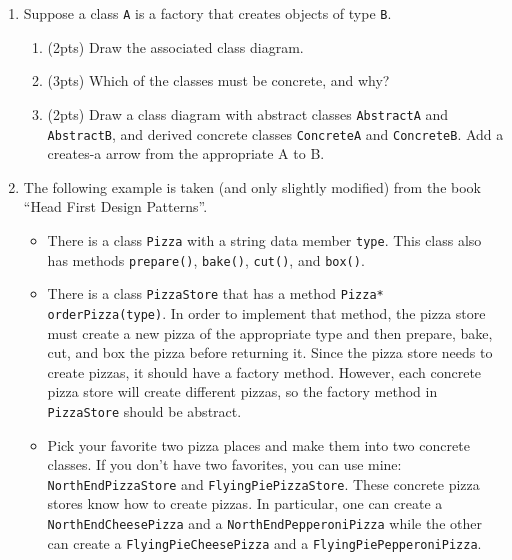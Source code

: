 \documentclass[11pt]{article}
\newlength{\up}\setlength{\up}{-\baselineskip}
\begin{document}
\begin{enumerate}
  \item Suppose a class \texttt{A} is a factory that creates objects of type \texttt{B}.

  \begin{enumerate}

    \item (2pts) Draw the associated class diagram.

    \vspace{0.5in}

    \item (3pts) Which of the classes must be concrete, and why?

    \vspace{0.5in}

    \item (2pts) Draw a class diagram with abstract classes \texttt{AbstractA} and \texttt{AbstractB}, and derived concrete classes \texttt{ConcreteA} and \texttt{ConcreteB}. Add a creates-a arrow from the appropriate A to B.

    \vspace{1in}

\newpage


  \end{enumerate}


  \item The following example is taken (and only slightly modified) from the book ``Head First Design Patterns''.

  \begin{itemize}
    \item There is a class \texttt{Pizza} with a string data member \texttt{type}. This class also has methods \texttt{prepare()}, \texttt{bake()}, \texttt{cut()}, and \texttt{box()}. 
    \item There is a class \texttt{PizzaStore} that has a method \texttt{Pizza* orderPizza(type)}. In order to implement that method, the pizza store must create a new pizza of the appropriate type and then prepare, bake, cut, and box the pizza before returning it. Since the pizza store needs to create pizzas, it should have a factory method. However, each concrete pizza store will create different pizzas, so the factory method in \texttt{PizzaStore} should be abstract. 
    \item Pick your favorite two pizza places and make them into two concrete classes. If you don't have two favorites, you can use mine: \texttt{NorthEndPizzaStore} and \texttt{FlyingPiePizzaStore}. These concrete pizza stores know how to create pizzas. In particular, one can create a \texttt{NorthEndCheesePizza} and a \texttt{NorthEndPepperoniPizza} while the other can create a \texttt{FlyingPieCheesePizza} and a \newline\texttt{FlyingPiePepperoniPizza}. 


\end{itemize}
\end{enumerate}
\end{document}
